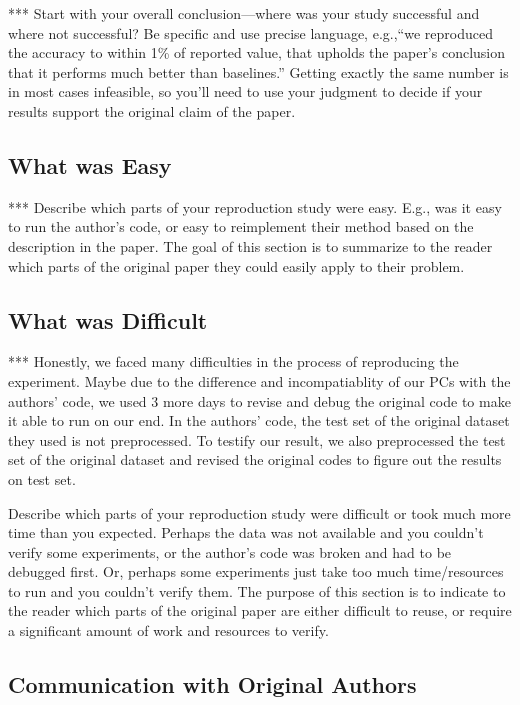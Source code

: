 \documentclass{article}
\begin{document}
*** Start with your overall conclusion---where was your study successful and where not successful? Be specific and use precise language, e.g.,``we reproduced the accuracy to within 1\% of reported value, that upholds the paper's conclusion that it performs much better than baselines.'' Getting exactly the same number is in most cases infeasible, so you'll need to use your judgment to decide if your results support the original claim of the paper. 

\subsection*{What was Easy}

*** Describe which parts of your reproduction study were easy. E.g., was it easy to run the author's code, or easy to reimplement their method based on the description in the paper. The goal of this section is to summarize to the reader which parts of the original paper they could easily apply to their problem. 

\subsection*{What was Difficult}

*** Honestly, we faced many difficulties in the process of reproducing the experiment. Maybe due to the difference and incompatiablity of our PCs with the authors' code, we used 3 more days to revise and debug the original code to make it able to run on our end. In the authors' code, the test set of the original dataset they used is not preprocessed. To testify our result, we also preprocessed the test set of the original dataset and revised the original codes to figure out the results on test set.

Describe which parts of your reproduction study were difficult or took much more time than you expected. Perhaps the data was not available and you couldn't verify some experiments, or the author's code was broken and had to be debugged first. Or, perhaps some experiments just take too much time/resources to run and you couldn't verify them. The purpose of this section is to indicate to the reader which parts of the original paper are either difficult to reuse, or require a significant amount of work and resources to verify. 

\subsection*{Communication with Original Authors}
\end{document}
